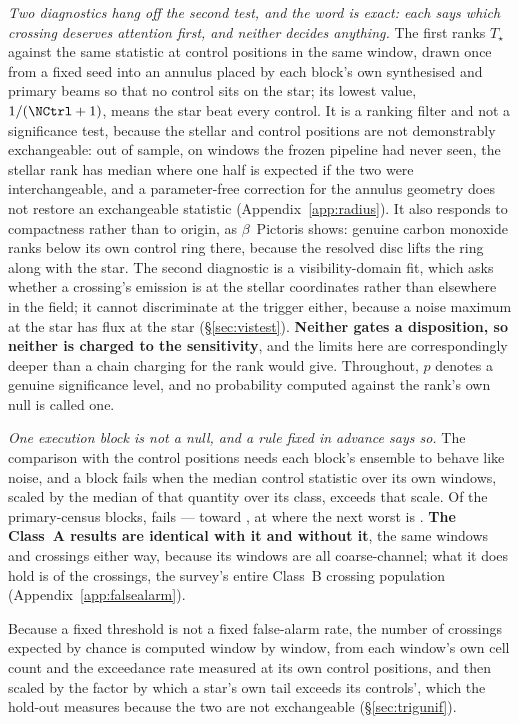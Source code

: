 \emph{Two diagnostics hang off the second test, and the word is exact: each
says which crossing deserves attention first, and neither decides anything.}
The first ranks $T_\star$ against the same statistic at \NCtrl{} control
positions in the same window, drawn once from a fixed seed into an annulus
placed by each block's own synthesised and primary beams so that no control
sits on the star; its lowest value, $1/(\NCtrl+1)$, means the star beat every
control. It is a ranking filter and not a significance test, because the
stellar and control positions are not demonstrably exchangeable: out of
sample, on \HoWin{} windows the frozen pipeline had never seen, the stellar
rank has median \HoRankMed{} where one half is expected if the two were
interchangeable, and a parameter-free correction for the annulus geometry
does not restore an exchangeable statistic (Appendix~\ref{app:radius}). It
also responds to compactness rather than to origin, as $\beta$~Pictoris
shows: genuine carbon monoxide ranks below its own control ring there,
because the resolved disc lifts the ring along with the star. The second
diagnostic is a visibility-domain fit, which asks whether a crossing's
emission is at the stellar coordinates rather than elsewhere in the field; it
cannot discriminate at the trigger either, because a noise maximum at the
star has flux at the star (\S\ref{sec:vistest}). \textbf{Neither gates a
disposition, so neither is charged to the sensitivity}, and the limits here
are correspondingly deeper than a chain charging for the rank would give.
Throughout, $p$ denotes a genuine significance level, and no probability
computed against the rank's own null is called one.

\emph{One execution block is not a null, and a rule fixed in advance says so.}
The comparison with the control positions needs each block's ensemble to behave
like noise, and a block fails when the median control statistic over its own
windows, scaled by the median of that quantity over its class, exceeds
\BqFactor{} that scale. Of the \BqNBlocks{} primary-census blocks, \BqNFail{}
fails --- \BqFailBlock{} toward \BqFailStar, at \BqFailQ{} where the next worst
is \BqNextQ. \textbf{The Class~A results are identical with it and without it},
the same \BqWinACut{} windows and \BqXrossACut{} crossings either way, because
its \BqFailNWin{} windows are all coarse-channel; what it does hold is
\BqFailNCross{} of the \NCross{} crossings, the survey's entire Class~B
crossing population (Appendix~\ref{app:falsealarm}).

Because a fixed threshold is not a fixed false-alarm rate, the number of
crossings expected by chance is computed window by window, from each window's
own cell count and the exceedance rate measured at its own control positions,
and then scaled by the factor by which a star's own tail exceeds its
controls', which the hold-out measures because the two are not exchangeable
(\S\ref{sec:trigunif}).


